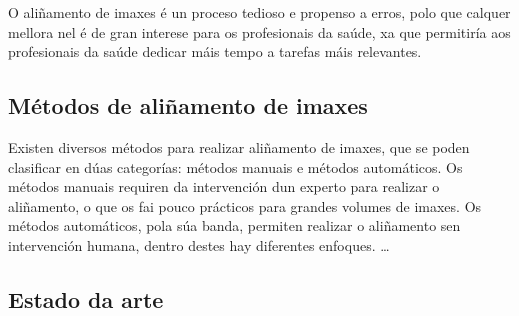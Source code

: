 O aliñamento de imaxes é un proceso tedioso e propenso a erros, polo que calquer mellora nel é de gran interese para os profesionais da saúde, 
xa que permitiría aos profesionais da saúde dedicar máis tempo a tarefas máis relevantes.

\subsection{Métodos de aliñamento de imaxes}
\label{subsec:Métodos de aliñamento de imaxes}
Existen diversos métodos para realizar aliñamento de imaxes, que se poden clasificar en dúas categorías: métodos manuais e métodos automáticos.
Os métodos manuais requiren da intervención dun experto para realizar o aliñamento, o que os fai pouco prácticos para grandes volumes de imaxes.
Os métodos automáticos, pola súa banda, permiten realizar o aliñamento sen intervención humana, dentro destes hay diferentes enfoques.
\dots

\subsection{Estado da arte}
\label{subsec:Estado da arte}
